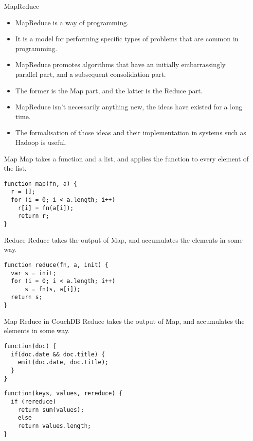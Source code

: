\documentclass{beamer}
\begin{document}
\begin{frame}{MapReduce}
	\begin{itemize}
		\item MapReduce is a way of programming.
		\item It is a model for performing specific types of problems that are common in programming.
		\item MapReduce promotes algorithms that have an initially embarrassingly parallel part, and a subsequent consolidation part.
		\item The former is the Map part, and the latter is the Reduce part.
		\item MapReduce isn't necessarily anything new, the ideas have existed for a long time.
		\item The formalisation of those ideas and their implementation in systems such as Hadoop is useful.
	\end{itemize}
\end{frame}


\begin{frame}[fragile]{Map}
Map takes a function and a list, and applies the function to every element of the list.
  \begin{verbatim}
function map(fn, a) {
  r = [];
  for (i = 0; i < a.length; i++)
  	r[i] = fn(a[i]);
	return r;
}
	\end{verbatim}
\end{frame}


\begin{frame}[fragile]{Reduce}
Reduce takes the output of Map, and accumulates the elements in some way.
  \begin{verbatim}
function reduce(fn, a, init) {
  var s = init;
  for (i = 0; i < a.length; i++)
      s = fn(s, a[i]);
  return s;
}
	\end{verbatim}
\end{frame}


\begin{frame}[fragile]{Map Reduce in CouchDB}
Reduce takes the output of Map, and accumulates the elements in some way.
  \begin{verbatim}
function(doc) {
  if(doc.date && doc.title) {
    emit(doc.date, doc.title);
  }
}
	\end{verbatim}
	
  \begin{verbatim}
function(keys, values, rereduce) {
  if (rereduce)
    return sum(values);
	else
    return values.length;
}
	\end{verbatim}
	

\end{frame}
\end{document}

